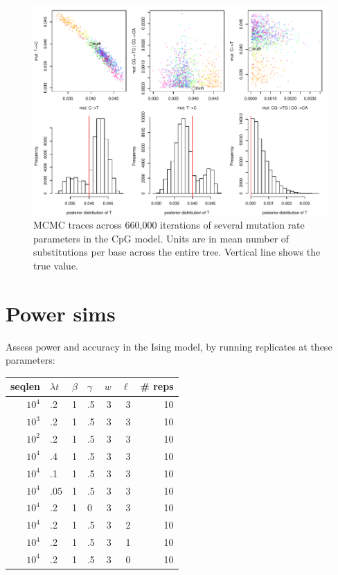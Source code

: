 \documentclass{article}
\theoremstyle{plain}
\theoremstyle{definition}
\begin{document}
\begin{figure}
  \begin{center}
    \includegraphics{writeup-plots/selsims-2013-06-03-13-17-0790276-mutrates}
  \end{center}
  \caption{
  MCMC traces across 660,000 iterations of several mutation rate parameters in the CpG model.
  Units are in mean number of substitutions per base across the entire tree.
  Vertical line shows the true value.
  }
\end{figure}

\section{Power sims}

Assess power and accuracy in the Ising model, by running replicates at these parameters:

\begin{tabular}{|rlllrrr|}
  \hline
  seqlen   &  $\lambda t$   &  $\beta$  &  $\gamma$  &  $w$ &  $\ell$   & \# reps \\
  \hline
  $10^4$    &   .2  &   1   &   .5  &   3   &   3   &   10  \\
  $10^3$    &   .2  &   1   &   .5  &   3   &   3   &   10  \\
  $10^2$    &   .2  &   1   &   .5  &   3   &   3   &   10  \\
  \hline
  $10^4$    &   .4  &   1   &   .5  &   3   &   3   &   10  \\
  $10^4$    &   .1  &   1   &   .5  &   3   &   3   &   10  \\
  $10^4$    &   .05  &   1   &   .5  &   3   &   3   &   10  \\
  \hline
  $10^4$    &   .2  &   1   &   0  &   3   &   3   &   10  \\
  \hline
  $10^4$    &   .2  &   1   &   .5  &   3   &   2   &   10  \\
  $10^4$    &   .2  &   1   &   .5  &   3   &   1   &   10  \\
  $10^4$    &   .2  &   1   &   .5  &   3   &   0   &   10  \\
  \hline
\end{tabular}
\end{document}
